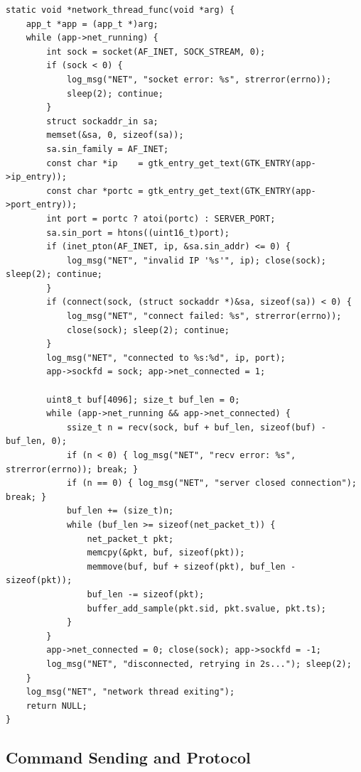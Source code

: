 \begin{verbatim}
static void *network_thread_func(void *arg) {
    app_t *app = (app_t *)arg;
    while (app->net_running) {
        int sock = socket(AF_INET, SOCK_STREAM, 0);
        if (sock < 0) {
            log_msg("NET", "socket error: %s", strerror(errno));
            sleep(2); continue;
        }
        struct sockaddr_in sa;
        memset(&sa, 0, sizeof(sa));
        sa.sin_family = AF_INET;
        const char *ip    = gtk_entry_get_text(GTK_ENTRY(app->ip_entry));
        const char *portc = gtk_entry_get_text(GTK_ENTRY(app->port_entry));
        int port = portc ? atoi(portc) : SERVER_PORT;
        sa.sin_port = htons((uint16_t)port);
        if (inet_pton(AF_INET, ip, &sa.sin_addr) <= 0) {
            log_msg("NET", "invalid IP '%s'", ip); close(sock); sleep(2); continue;
        }
        if (connect(sock, (struct sockaddr *)&sa, sizeof(sa)) < 0) {
            log_msg("NET", "connect failed: %s", strerror(errno));
            close(sock); sleep(2); continue;
        }
        log_msg("NET", "connected to %s:%d", ip, port);
        app->sockfd = sock; app->net_connected = 1;

        uint8_t buf[4096]; size_t buf_len = 0;
        while (app->net_running && app->net_connected) {
            ssize_t n = recv(sock, buf + buf_len, sizeof(buf) - buf_len, 0);
            if (n < 0) { log_msg("NET", "recv error: %s", strerror(errno)); break; }
            if (n == 0) { log_msg("NET", "server closed connection"); break; }
            buf_len += (size_t)n;
            while (buf_len >= sizeof(net_packet_t)) {
                net_packet_t pkt;
                memcpy(&pkt, buf, sizeof(pkt));
                memmove(buf, buf + sizeof(pkt), buf_len - sizeof(pkt));
                buf_len -= sizeof(pkt);
                buffer_add_sample(pkt.sid, pkt.svalue, pkt.ts);
            }
        }
        app->net_connected = 0; close(sock); app->sockfd = -1;
        log_msg("NET", "disconnected, retrying in 2s..."); sleep(2);
    }
    log_msg("NET", "network thread exiting");
    return NULL;
}
\end{verbatim}

\subsection{Command Sending and Protocol}

